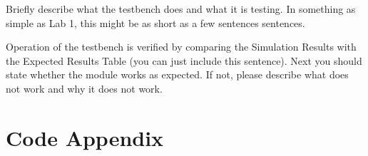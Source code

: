 \documentclass{article}
\newcommand{\Verilog}[3]{
  \lstset{language=Verilog}
  \lstset{backgroundcolor=\color{listinggray},rulecolor=\color{blue}}
  \lstset{linewidth=\textwidth}
  \lstset{commentstyle=\textit, stringstyle=\upshape,showspaces=false}
  \lstset{frame=tb}
  
}
\begin{document}
Briefly describe what the testbench does and what it is testing.  In something as simple as Lab 1, this might be as short as a few sentences sentences.   

Operation of the testbench is verified by comparing the Simulation Results with the Expected Results Table (you can just include this sentence).  Next you should state whether the module works as expected.  If not, please describe what does not work and why it does not work.




\pagebreak

\section{Code Appendix}
\end{document}
